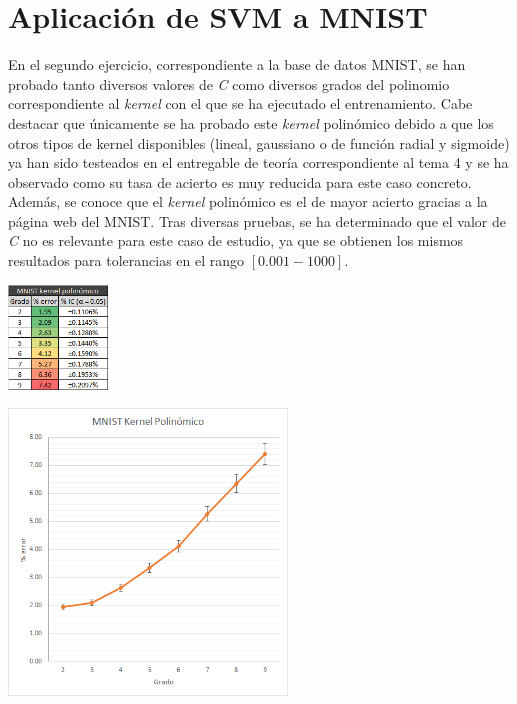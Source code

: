 \documentclass[a4paper]{article}
\begin{document}
\section{Aplicación de SVM a MNIST}
\quad En el segundo ejercicio, correspondiente a la base de datos MNIST, se han probado tanto diversos valores de \textit{C} como diversos grados del polinomio correspondiente al \textit{kernel} con el que se ha ejecutado el entrenamiento. Cabe destacar que únicamente se ha probado este \textit{kernel} polinómico debido a que los otros tipos de kernel disponibles (lineal, gaussiano o de función radial y sigmoide) ya han sido testeados en el entregable de teoría correspondiente al tema 4 y se ha observado como  su tasa de acierto es muy reducida para este caso concreto. Además, se conoce que el \textit{kernel} polinómico es el de mayor acierto gracias a la página web del MNIST. Tras diversas pruebas, se ha determinado que el valor de \textit{C} no es relevante para este caso de estudio, ya que se obtienen los mismos resultados para tolerancias en el rango $\left[ 0.001-1000 \right]$.

\begin{center}
\includegraphics[width=100px]{2_mnist}

\includegraphics[width=280px]{2_mnist_plot}
\end{center}
\end{document}
